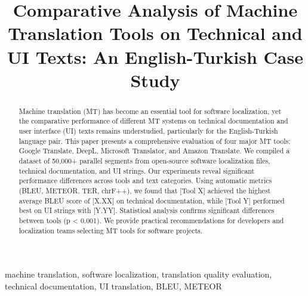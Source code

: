 \documentclass[conference]{IEEEtran}
\begin{document}
\title{Comparative Analysis of Machine Translation Tools on Technical and UI Texts: An English-Turkish Case Study}

\author{
}

\maketitle

\begin{abstract}
Machine translation (MT) has become an essential tool for software localization, yet the comparative performance of different MT systems on technical documentation and user interface (UI) texts remains understudied, particularly for the English-Turkish language pair. This paper presents a comprehensive evaluation of four major MT tools: Google Translate, DeepL, Microsoft Translator, and Amazon Translate. We compiled a dataset of 50,000+ parallel segments from open-source software localization files, technical documentation, and UI strings. Our experiments reveal significant performance differences across tools and text categories. Using automatic metrics (BLEU, METEOR, TER, chrF++), we found that [Tool X] achieved the highest average BLEU score of [X.XX] on technical documentation, while [Tool Y] performed best on UI strings with [Y.YY]. Statistical analysis confirms significant differences between tools (p < 0.001). We provide practical recommendations for developers and localization teams selecting MT tools for software projects.
\end{abstract}

\begin{IEEEkeywords}
machine translation, software localization, translation quality evaluation, technical documentation, UI translation, BLEU, METEOR
\end{IEEEkeywords}












\end{document}
